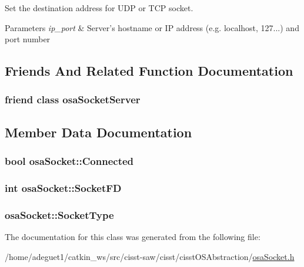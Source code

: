 Set the destination address for U\-D\-P or T\-C\-P socket. 


\begin{DoxyParams}{Parameters}
{\em ip\-\_\-port} & Server's hostname or I\-P address (e.\-g. localhost, 127...) and port number \\
\hline
\end{DoxyParams}


\subsection{Friends And Related Function Documentation}
\hypertarget{classosa_socket_abe48006d88cc6ef49f926f1eab169439}{
\subsubsection[{osa\-Socket\-Server}]{\setlength{\rightskip}{0pt plus 5cm}friend class {\bf osa\-Socket\-Server}\hspace{0.3cm}{\ttfamily [friend]}}}\label{classosa_socket_abe48006d88cc6ef49f926f1eab169439}


\subsection{Member Data Documentation}
\hypertarget{classosa_socket_ab44f88953d932cd97a9c772155d21e37}{
\subsubsection[{Connected}]{\setlength{\rightskip}{0pt plus 5cm}bool osa\-Socket\-::\-Connected\hspace{0.3cm}{\ttfamily [protected]}}}\label{classosa_socket_ab44f88953d932cd97a9c772155d21e37}
\hypertarget{classosa_socket_aa2b18a862994f6498868186a44d28793}{
\subsubsection[{Socket\-F\-D}]{\setlength{\rightskip}{0pt plus 5cm}int osa\-Socket\-::\-Socket\-F\-D\hspace{0.3cm}{\ttfamily [protected]}}}\label{classosa_socket_aa2b18a862994f6498868186a44d28793}
\hypertarget{classosa_socket_ac893ce4c18feac9b627df95993156482}{
\subsubsection[{Socket\-Type}]{ osa\-Socket\-::\-Socket\-Type\hspace{0.3cm}{\ttfamily [protected]}}}\label{classosa_socket_ac893ce4c18feac9b627df95993156482}


The documentation for this class was generated from the following file\-:\begin{DoxyCompactItemize}
\item 
/home/adeguet1/catkin\-\_\-ws/src/cisst-\/saw/cisst/cisst\-O\-S\-Abstraction/\hyperlink{osa_socket_8h}{osa\-Socket.\-h}\end{DoxyCompactItemize}
